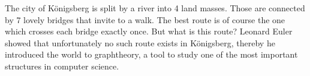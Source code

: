 
The city of Königsberg is split by a river into 4 land masses. Those are connected by 7 lovely bridges that invite to a walk. The best route is of course the one which crosses each bridge exactly once.
But what is this route? Leonard Euler showed that unfortunately no such route exists in Königsberg, thereby he introduced the world to graphtheory, a tool to study one of the most important structures in computer science.

